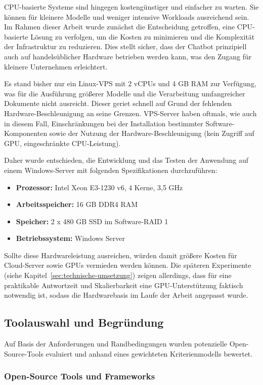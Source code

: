 CPU-basierte Systeme sind hingegen kostengünstiger und einfacher zu warten.
Sie können für kleinere Modelle und weniger intensive Workloads ausreichend sein.
Im Rahmen dieser Arbeit wurde zunächst die Entscheidung getroffen, eine CPU-basierte Lösung zu verfolgen, um die Kosten zu minimieren und die Komplexität der Infrastruktur zu reduzieren.
Dies stellt sicher, dass der Chatbot prinzipiell auch auf handelsüblicher Hardware betrieben werden kann, was den Zugang für kleinere Unternehmen erleichtert.

Es stand bisher nur ein Linux-VPS mit 2 vCPUs und 4 GB RAM zur Verfügung, was für die Ausführung größerer Modelle und die Verarbeitung umfangreicher Dokumente nicht ausreicht.
Dieser geriet schnell auf Grund der fehlenden Hardware-Beschleunigung an seine Grenzen.
VPS-Server haben oftmals, wie auch in diesem Fall, Einschränkungen bei der Installation bestimmter Software-Komponenten sowie der Nutzung der Hardware-Beschleunigung (kein Zugriff auf GPU, eingeschränkte CPU-Leistung).

Daher wurde entschieden, die Entwicklung und das Testen der Anwendung auf einem Windows-Server mit folgenden Spezifikationen durchzuführen:

\begin{itemize}
    \item \textbf{Prozessor:} Intel Xeon E3-1230 v6, 4 Kerne, 3{,}5 GHz
    \item \textbf{Arbeitsspeicher:} 16 GB DDR4 RAM
    \item \textbf{Speicher:} 2 x 480 GB SSD im Software-RAID 1
    \item \textbf{Betriebssystem:} Windows Server
\end{itemize}

Sollte diese Hardwareleistung ausreichen, würden damit größere Kosten für Cloud-Server sowie GPUs vermieden werden können.
Die späteren Experimente (siehe Kapitel~\ref{sec:technische-umsetzung}) zeigen allerdings, dass für eine praktikable Antwortzeit und Skalierbarkeit eine GPU-Unterstützung faktisch notwendig ist, sodass die Hardwarebasis im Laufe der Arbeit angepasst wurde.
\subsection{Toolauswahl und Begründung}\label{subsec:toolauswahl}
Auf Basis der Anforderungen und Randbedingungen wurden potenzielle Open-Source-Tools evaluiert und anhand eines gewichteten Kriterienmodells bewertet.

\subsubsection{Open-Source Tools und Frameworks}\label{subsubsec:open-source-tools-und-frameworks}

